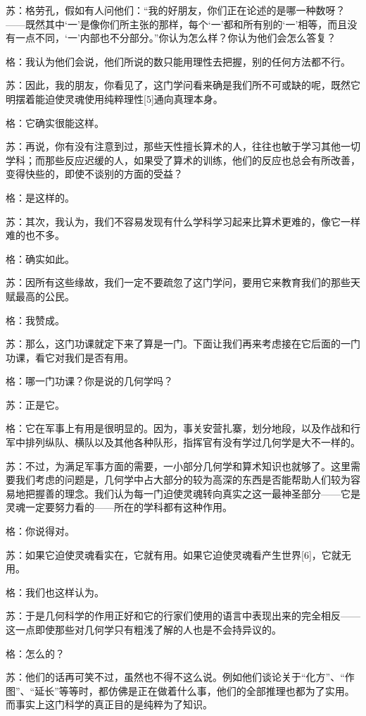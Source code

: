 \documentclass[12pt,oneside]{book}
\begin{document}
苏：格劳孔，假如有人问他们：“我的好朋友，你们正在论述的是哪一种数呀？——既然其中‘一’是像你们所主张的那样，每个‘一’都和所有别的‘一’相等，而且没有一点不同，‘一’内部也不分部分。”你认为怎么样？你认为他们会怎么答复？

格：我认为他们会说，他们所说的数只能用理性去把握，别的任何方法都不行。

苏：因此，我的朋友，你看见了，这门学问看来确是我们所不可或缺的呢，既然它明摆着能迫使灵魂使用纯粹理性[5]通向真理本身。

格：它确实很能这样。

苏：再说，你有没有注意到过，那些天性擅长算术的人，往往也敏于学习其他一切学科；而那些反应迟缓的人，如果受了算术的训练，他们的反应也总会有所改善，变得快些的，即使不谈别的方面的受益？

格：是这样的。

苏：其次，我认为，我们不容易发现有什么学科学习起来比算术更难的，像它一样难的也不多。

格：确实如此。

苏：因所有这些缘故，我们一定不要疏忽了这门学问，要用它来教育我们的那些天赋最高的公民。

格：我赞成。

苏：那么，这门功课就定下来了算是一门。下面让我们再来考虑接在它后面的一门功课，看它对我们是否有用。

格：哪一门功课？你是说的几何学吗？

苏：正是它。

格：它在军事上有用是很明显的。因为，事关安营扎寨，划分地段，以及作战和行军中排列纵队、横队以及其他各种队形，指挥官有没有学过几何学是大不一样的。

苏：不过，为满足军事方面的需要，一小部分几何学和算术知识也就够了。这里需要我们考虑的问题是，几何学中占大部分的较为高深的东西是否能帮助人们较为容易地把握善的理念。我们认为每一门迫使灵魂转向真实之这一最神圣部分——它是灵魂一定要努力看的——所在的学科都有这种作用。

格：你说得对。

苏：如果它迫使灵魂看实在，它就有用。如果它迫使灵魂看产生世界[6]，它就无用。

格：我们也这样认为。

苏：于是几何科学的作用正好和它的行家们使用的语言中表现出来的完全相反——这一点即使那些对几何学只有粗浅了解的人也是不会持异议的。

格：怎么的？

苏：他们的话再可笑不过，虽然也不得不这么说。例如他们谈论关于“化方”、“作图”、“延长”等等时，都仿佛是正在做着什么事，他们的全部推理也都为了实用。而事实上这门科学的真正目的是纯粹为了知识。
\end{document}
